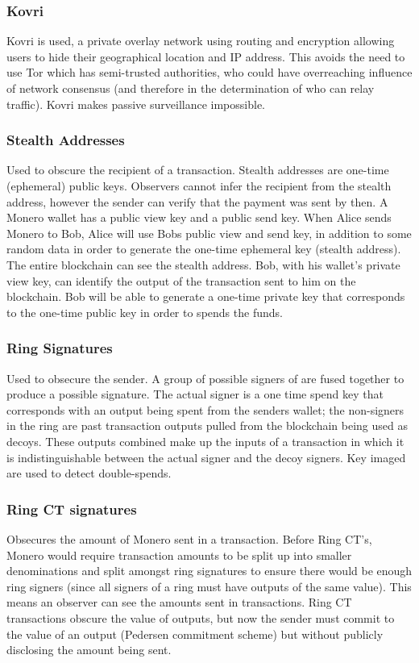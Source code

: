 \subsubsection{Kovri}
Kovri is used, a private overlay network using routing and encryption allowing users to hide their geographical location and IP address. This avoids the need to use Tor which has semi-trusted authorities, who could have overreaching influence of network consensus (and therefore in the determination of who can relay traffic). Kovri makes passive surveillance impossible. 

\subsubsection{Stealth Addresses}
Used to obscure the recipient of a transaction. Stealth addresses are one-time (ephemeral) public keys. Observers cannot infer the recipient from the stealth address, however the sender can verify that the payment was sent by then. A Monero wallet has a public view key and a public send key. When Alice sends Monero to Bob, Alice will use Bobs public view and send key, in addition to some random data in order to generate the one-time ephemeral key (stealth address). The entire blockchain can see the stealth address. Bob, with his wallet's private view key, can identify the output of the transaction sent to him on the blockchain. Bob will be able to generate a one-time private key that corresponds to the one-time public key in order to spends the funds. 

\subsubsection{Ring Signatures}
Used to obsecure the sender.
A group of possible signers of are fused together to produce a possible signature. The actual signer is a one time spend key that corresponds with an output being spent from the senders wallet; the non-signers in the ring are past transaction outputs pulled from the blockchain being used as decoys. These outputs combined make up the inputs of a transaction in which it is indistinguishable between the actual signer and the decoy signers. Key imaged are used to detect double-spends. 

\subsubsection{Ring CT signatures}
Obsecures the amount of Monero sent in a transaction. 
Before Ring CT's, Monero would require transaction amounts to be split up into smaller denominations and split amongst ring signatures to ensure there would be enough ring signers (since all signers of a ring must have outputs of the same value). This means an observer can see the amounts sent in transactions. Ring CT transactions obscure the value of outputs, but now the sender must commit to the value of an output (Pedersen commitment scheme) but without publicly disclosing the amount being sent. 



